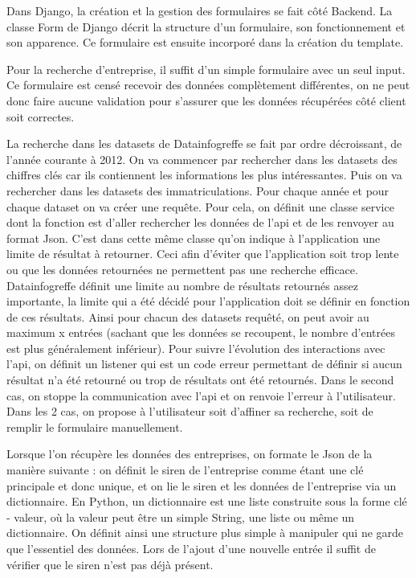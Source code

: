 \documentclass[french]{article}
\begin{document}
{Dans Django, la création et la gestion des formulaires se fait côté Backend. La classe Form de Django décrit la structure d'un formulaire, son fonctionnement et son apparence. Ce formulaire est ensuite incorporé dans la création du template. 

Pour la recherche d'entreprise, il suffit d'un simple formulaire avec un seul input. Ce formulaire est censé recevoir des données complètement différentes, on ne peut donc faire aucune validation pour s'assurer que les données récupérées côté client soit correctes.

La recherche dans les datasets de Datainfogreffe se fait par ordre décroissant, de l'année courante à 2012. On va commencer par rechercher dans les datasets des chiffres clés car ils contiennent les informations les plus intéressantes. Puis on va rechercher dans les datasets des immatriculations.
\newline{}
Pour chaque année et pour chaque dataset on va créer une requête. Pour cela, on définit une classe service dont la fonction est d'aller rechercher les données de l'api et de les renvoyer au format Json. C'est dans cette même classe qu'on indique à l'application une limite de résultat à retourner. Ceci afin d'éviter que l'application soit trop lente ou que les données retournées ne permettent pas une recherche efficace. 
\newline{}
Datainfogreffe définit une limite au nombre de résultats retournés assez importante, la limite qui a été décidé pour l'application doit se définir en fonction de ces résultats. Ainsi pour chacun des datasets requêté, on peut avoir au maximum x entrées (sachant que les données se recoupent, le nombre d'entrées est plus généralement inférieur). Pour suivre l'évolution des interactions avec l'api, on définit un listener qui est un code erreur permettant de définir si aucun résultat n'a été retourné ou trop de résultats ont été retournés. Dans le second cas, on stoppe la communication avec l'api et on renvoie l'erreur à l'utilisateur. Dans les 2 cas, on propose à l'utilisateur soit d'affiner sa recherche, soit de remplir le formulaire manuellement.

Lorsque l'on récupère les données des entreprises, on formate le Json de la manière suivante : on définit le siren de l'entreprise comme étant une clé principale et donc unique, et on lie le siren et les données de l'entreprise via un dictionnaire. En Python, un dictionnaire est une liste construite sous la forme clé - valeur, où la valeur peut être un simple String, une liste ou même un dictionnaire. On définit ainsi une structure plus simple à manipuler qui ne garde que l'essentiel des données. Lors de l'ajout d'une nouvelle entrée il suffit de vérifier que le siren n'est pas déjà présent.

}
\end{document}
